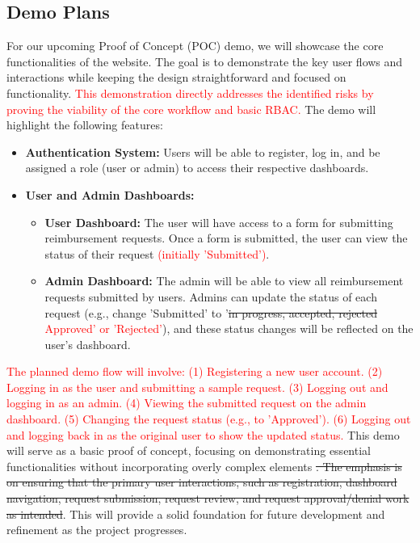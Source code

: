 \documentclass{article}
\begin{document}
\subsection{Demo Plans}

For our upcoming Proof of Concept (POC) demo, we will showcase the core functionalities of the website. The goal is to demonstrate the key user flows and interactions while keeping the design straightforward and focused on functionality. \textcolor{red}{This demonstration directly addresses the identified risks by proving the viability of the core workflow and basic RBAC.} The demo will highlight the following features:

\begin{itemize}
    \item \textbf{Authentication System:} Users will be able to register, log in, and be assigned a role (user or admin) to access their respective dashboards.

    \item \textbf{User and Admin Dashboards:}
    \begin{itemize}
        \item \textbf{User Dashboard:} The user will have access to a form for submitting reimbursement requests. Once a form is submitted, the user can view the status of their request \textcolor{red}{(initially 'Submitted')}.

        \item \textbf{Admin Dashboard:} The admin will be able to view all reimbursement requests submitted by users. Admins can update the status of each request (e.g., change 'Submitted' to '\sout{in progress, accepted, rejected} \textcolor{red}{Approved' or 'Rejected'}), and these status changes will be reflected on the user’s dashboard.
    \end{itemize}
\end{itemize}

\textcolor{red}{The planned demo flow will involve: (1) Registering a new user account. (2) Logging in as the user and submitting a sample request. (3) Logging out and logging in as an admin. (4) Viewing the submitted request on the admin dashboard. (5) Changing the request status (e.g., to 'Approved'). (6) Logging out and logging back in as the original user to show the updated status.} This demo will serve as a basic proof of concept, focusing on demonstrating essential functionalities without incorporating overly complex elements \sout{. The emphasis is on ensuring that the primary user interactions, such as registration, dashboard navigation, request submission, request review, and request approval/denial work as intended}. This will provide a solid foundation for future development and refinement as the project progresses.
\end{document}
